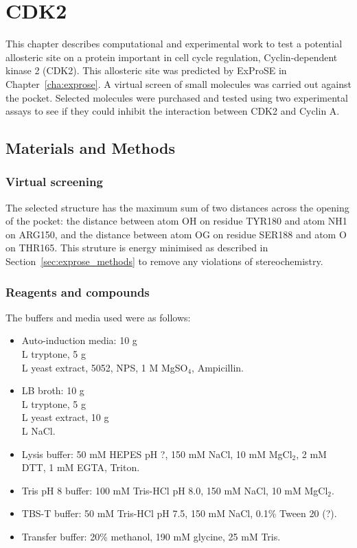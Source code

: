 \chapter{CDK2}
\label{cha:cdk2}

This chapter describes computational and experimental work to test a potential allosteric site on a protein important in cell cycle regulation, Cyclin-dependent kinase 2 (CDK2).
This allosteric site was predicted by ExProSE in Chapter~\ref{cha:exprose}.
A virtual screen of small molecules was carried out against the pocket.
Selected molecules were purchased and tested using two experimental assays to see if they could inhibit the interaction between CDK2 and Cyclin A.


\section{Materials and Methods}
\label{sec:cdk2_methods}

\subsection{Virtual screening}

The selected structure has the maximum sum of two distances across the opening of the pocket: the distance between atom OH on residue TYR180 and atom NH1 on ARG150, and the distance between atom OG on residue SER188 and atom O on THR165.
This struture is energy minimised as described in Section~\ref{sec:exprose_methods} to remove any violations of stereochemistry.


\subsection{Reagents and compounds}

The buffers and media used were as follows:
\begin{itemize}
\item Auto-induction media: 10 g\\L tryptone, 5 g\\L yeast extract, 5052, NPS, 1 M MgSO$_{4}$, Ampicillin.
\item LB broth: 10 g\\L tryptone, 5 g\\L yeast extract, 10 g\\L NaCl.
\item Lysis buffer: 50 mM HEPES pH ?, 150 mM NaCl, 10 mM MgCl$_{2}$, 2 mM DTT, 1 mM EGTA, Triton.
\item Tris pH 8 buffer: 100 mM Tris-HCl pH 8.0, 150 mM NaCl, 10 mM MgCl$_{2}$.
\item TBS-T buffer: 50 mM Tris-HCl pH 7.5, 150 mM NaCl, 0.1\% Tween 20 (?).
\item Transfer buffer: 20\% methanol, 190 mM glycine, 25 mM Tris.
\end{itemize}



